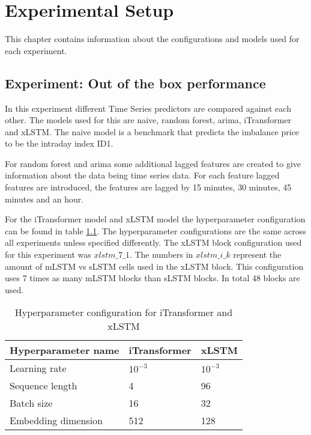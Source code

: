 \documentclass[class=scrbook, crop=false]{standalone}
\begin{document}
\chapter{Experimental Setup} %
\label{Chapter::Experimental_Setup}
   This chapter contains information about the configurations and models used for each experiment. 

\section{Experiment: Out of the box performance}
\label{Section::Experiment_out_of_the_box}

In this experiment different Time Series predictors are compared against each other.
The models used for this are naive, random forest, arima, iTransformer and xLSTM.
The naive model is a benchmark that predicts the imbalance price to be the intraday index ID1. 

For random forest and arima some additional lagged features are created to give information about the data being time series data.
For each feature lagged features are introduced, the features are lagged by 15 minutes, 30 minutes, 45 minutes and an hour.

For the iTransformer model and xLSTM model the hyperparameter configuration can be found in table \ref{Table::Raw_hyperparameters}.
The hyperparameter configurations are the same across all experiments unless specified differently.
The xLSTM block configuration used for this experiment was $xlstm\_7\_1$. 
The numbers in $xlstm\_i\_k$ represent the amount of mLSTM vs sLSTM cells used in the xLSTM block.
This configuration uses 7 times as many mLSTM blocks than sLSTM blocks. 
In total 48 blocks are used. 

\begin{table}[]
\centering
\begin{tabular}{l|l|l}
 Hyperparameter name & iTransformer & xLSTM   \\\hline
 Learning rate & $10^{-3}$ & $10^{-3} $ \\
 Sequence length & 4 & 96  \\
 Batch size & 16 & 32  \\
 Embedding dimension & 512 & 128  \\
 
\end{tabular}
\caption{Hyperparameter configuration for iTransformer and xLSTM}
\label{Table::Raw_hyperparameters}
\end{table}
\end{document}
